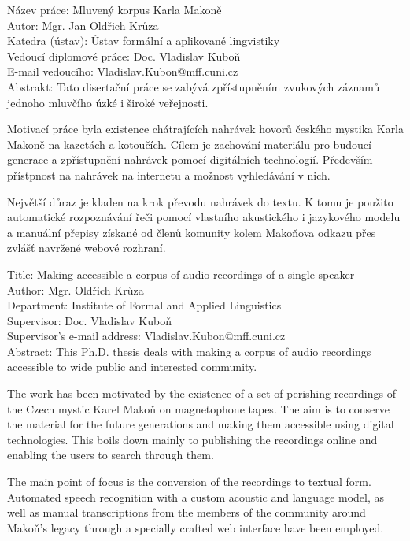 \noindent Název práce: Mluven\'{y} korpus Karla Makon\v{e}\\
Autor: Mgr. Jan Oldřich Krůza\\
Katedra (ústav): Ústav formální a aplikované lingvistiky\\
Vedoucí diplomové práce: Doc. Vladislav Kuboň\\
E-mail vedoucího: Vladislav.Kubon@mff.cuni.cz\\

\noindent Abstrakt: Tato disertační práce se zabývá zpřístupněním zvukových
záznamů jednoho mluvčího úzké i široké veřejnosti.

Motivací práce byla existence chátrajících nahrávek hovorů českého mystika
Karla Makoně na kazetách a kotoučích. Cílem je zachování materiálu pro
budoucí generace a zpřístupnění nahrávek pomocí digitálních technologií.
Především přístpnost na nahrávek na internetu a možnost vyhledávání v nich.

Největší důraz je kladen na krok převodu nahrávek do textu. K tomu je použito
automatické rozpoznávání řeči pomocí vlastního akustického i jazykového modelu
a manuální přepisy získané od členů komunity kolem Makoňova odkazu přes zvlášť
navržené webové rozhraní.

\vspace{10mm}

\noindent
Title: Making accessible a corpus of audio recordings of a single speaker\\
Author: Mgr. Oldřich Krůza\\
Department: Institute of Formal and Applied Linguistics\\
Supervisor: Doc. Vladislav Kuboň\\
Supervisor's e-mail address: Vladislav.Kubon@mff.cuni.cz\\

\noindent Abstract:  This Ph.D. thesis deals with making a corpus of audio
recordings accessible to wide public and interested community.

The work has been motivated by the existence of a set of perishing recordings
of the Czech mystic Karel Makoň on magnetophone tapes. The aim is to conserve
the material for the future generations and making them accessible using
digital technologies. This boils down mainly to publishing the recordings online
and enabling the users to search through them.

The main point of focus is the conversion of the recordings to textual form.
Automated speech recognition with a custom acoustic and language model, as well
as manual transcriptions from the members of the community around Makoň's legacy
through a specially crafted web interface have been employed.

